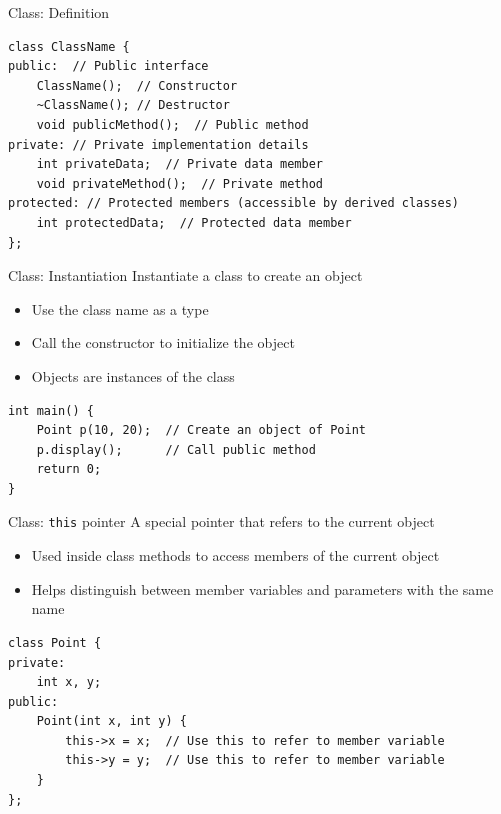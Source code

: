 \begin{frame}[fragile]{Class: Definition}
	\begin{verbatim}
class ClassName {
public:  // Public interface
    ClassName();  // Constructor
    ~ClassName(); // Destructor
    void publicMethod();  // Public method
private: // Private implementation details
    int privateData;  // Private data member
    void privateMethod();  // Private method
protected: // Protected members (accessible by derived classes)
    int protectedData;  // Protected data member
};
    \end{verbatim}
\end{frame}

\begin{frame}[fragile]{Class: Instantiation}
	Instantiate a class to create an object
	\begin{itemize}
		\item Use the class name as a type
		\item Call the constructor to initialize the object
		\item Objects are instances of the class
	\end{itemize}
	\begin{verbatim}
int main() {
    Point p(10, 20);  // Create an object of Point
    p.display();      // Call public method
    return 0;
}
    \end{verbatim}
\end{frame}

\begin{frame}[fragile]{Class: \texttt{this} pointer}
	A special pointer that refers to the current object

	\begin{itemize}
		\item Used inside class methods to access members of the current object
		\item Helps distinguish between member variables and parameters with the same name
	\end{itemize}

	\begin{verbatim}
class Point {
private:
    int x, y;
public:
    Point(int x, int y) {
        this->x = x;  // Use this to refer to member variable
        this->y = y;  // Use this to refer to member variable
    }
};
    \end{verbatim}
\end{frame}

